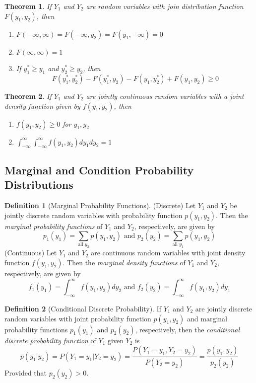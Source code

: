 \documentclass{article}
\theoremstyle{plain}
\newtheorem{thm}{Theorem}[section]
\theoremstyle{definition}
\newtheorem{defn}{Definition}[section]
\theoremstyle{remark}
\begin{document}
\begin{thm}
  If $Y_1$ and $Y_2$ are random variables with join distribution function $F(y_1, y_2)$, then
\begin{enumerate}
\item $F(-\infty , \infty) = F(- \infty , y_2) = F(y_1, - \infty ) = 0$
\item $F(\infty, \infty) = 1$
\item If $y_1^{*} \geq y_1$ and $y_2^{*} \geq y_2$, then
$$
F(y_1^*,y_2^*) - F(y_1^*,y_2) - F(y_1, y_2^*) + F(y_1, y_2) \geq 0
$$
\end{enumerate}
\end{thm}

\begin{thm}
If $Y_1$ and $Y_2$ are jointly continuous random variables with a joint density function given by $f(y_1, y_2)$, then
\begin{enumerate}
\item $f(y_1, y_2) \geq 0$ for $y_1, y_2$
\item $\int_{-\infty}^{\infty} \int_{-\infty}^{\infty} f(y_1, y_2) dy_1 dy_2 = 1$
\end{enumerate}
\end{thm}

\subsection{Marginal and Condition Probability Distributions}
\begin{defn}[Marginal Probability Functions]
(Discrete) Let $Y_1$ and $Y_2$ be jointly discrete random variables with probability function $p(y_1, y_2)$. Then the \textit{marginal probability functions} of $Y_1$ and $Y_2$, respectively, are given by
$$
p_1(y_1) = \displaystyle \sum_{\text{all }y_2} p(y_1, y_2) \text{ and } 
p_2(y_2) = \displaystyle \sum_{\text{all }y_1} p(y_1, y_2)
$$
(Continuous) Let $Y_1$ and $Y_2$ are continuous random variables with joint density function $f(y_1, y_2)$. Then the \textit{marginal density functions} of $Y_1$ and $Y_2$, respectively, are given by
$$
f_1(y_1) = \displaystyle \int_{-\infty}^{\infty} f(y_1, y_2)dy_2 \text{ and }
f_2(y_2) = \displaystyle \int_{-\infty}^{\infty} f(y_1, y_2)dy_1
$$
\end{defn}

\begin{defn}[Conditional Discrete Probability]
If $Y_1$ and $Y_2$ are jointly discrete random variables with joint probability function $p(y_1, y_2)$ and marginal probability functions $p_1(y_1)$ and $p_2(y_2)$, respectively, then the \textit{conditional discrete probability function} of $Y_1$ given $Y_2$ is
$$
p(y_1|y_2) = P(Y_1 = y_1|Y_2 = y_2) = \frac{P(Y_1 = y_1, Y_2 = y_2)}{P(Y_2 = y_2)}
= \frac{p(y_1,y_2)}{p_2(y_2)}
$$
Provided that $p_2(y_2) > 0$.
\end{defn}
\end{document}
